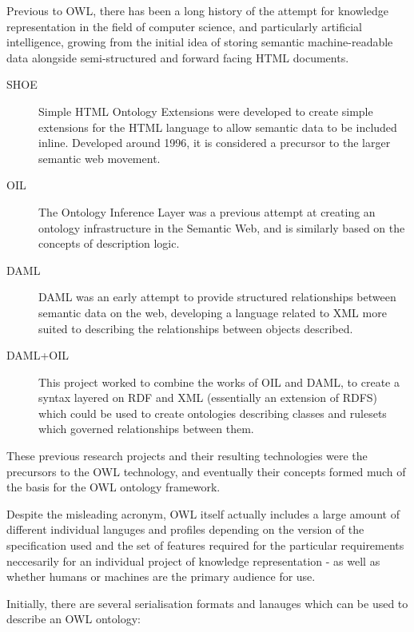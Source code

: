 \documentclass{article}
\begin{document}
Previous to OWL, there has been a long history of the attempt for knowledge
representation in the field of computer science, and particularly
artificial intelligence, growing from the initial idea of storing semantic
machine-readable data alongside semi-structured and forward facing HTML
documents. 

\begin{description}
    \item[SHOE] Simple HTML Ontology Extensions were developed to create simple
    extensions for the HTML language to allow semantic data to be included
    inline. Developed around 1996, it is considered a precursor to the larger
    semantic web movement.\cite{shoe}
    \item[OIL] The Ontology Inference Layer\cite{oil} was a previous attempt at creating
    an ontology infrastructure in the Semantic Web, and is similarly based on
    the concepts of description logic.
    \item[DAML] DAML\cite{daml} was an early attempt to provide structured relationships
    between semantic data on the web, developing a language related to XML more
    suited to describing the relationships between objects described.
    \item[DAML+OIL] This project worked to combine the works of OIL and DAML, to
    create a syntax layered on RDF and XML (essentially an extension of RDFS) which 
    could be used to create ontologies describing classes and rulesets which governed 
    relationships between them.\cite{damloil}
\end{description}

These previous research projects and their resulting technologies were the
precursors to the OWL technology, and eventually their concepts formed much of
the basis for the OWL ontology framework.

Despite the misleading acronym, OWL itself actually includes a large amount of
different individual languges and profiles depending on the version of the 
specification used and the set of features required for the particular
requirements neccesarily for an individual project of knowledge
representation - as well as whether humans or machines are the primary audience 
for use. 

Initially, there are several serialisation formats and lanauges which can be
used to describe an OWL ontology:
\end{document}
